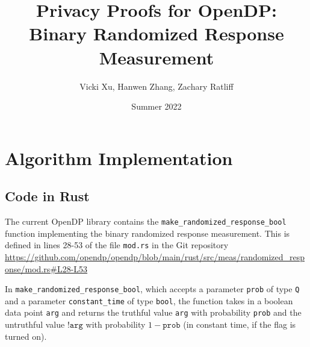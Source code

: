 \documentclass[11pt,a4paper]{article}
\title{Privacy Proofs for OpenDP: Binary Randomized Response Measurement}
\author{Vicki Xu, Hanwen Zhang, Zachary Ratliff}
\date{Summer 2022}
\theoremstyle{definition}
\begin{document}
\maketitle
\tableofcontents


\section{Algorithm Implementation}
\subsection{Code in Rust}

The current OpenDP library contains the \texttt{make\_randomized\_response\_bool} function implementing the binary randomized response measurement. This is defined in lines 28-53 of the file \texttt{mod.rs} in the Git repository \url{https://github.com/opendp/opendp/blob/main/rust/src/meas/randomized_response/mod.rs#L28-L53}

In \texttt{make\_randomized\_response\_bool}, which accepts a parameter \texttt{prob} of type \texttt{Q} and a parameter \texttt{constant\_time} of type \texttt{bool}, the function takes in a boolean data point \texttt{arg} and returns the truthful value \texttt{arg} with probability \texttt{prob} and the untruthful value $\texttt{!arg}$ with probability $1 - \texttt{prob}$ (in constant time, if the flag is turned on). 
\end{document}
